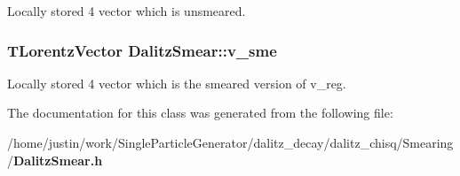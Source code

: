 Locally stored 4 vector which is unsmeared. 

\subsubsection{\setlength{\rightskip}{0pt plus 5cm}TLorentz\-Vector \bf{Dalitz\-Smear::v\_\-sme}}\label{classDalitzSmear_87df42c7420bd96bcd61ce25d10ec6ed}


Locally stored 4 vector which is the smeared version of v\_\-reg. 



The documentation for this class was generated from the following file:\begin{CompactItemize}
\item 
/home/justin/work/Single\-Particle\-Generator/dalitz\_\-decay/dalitz\_\-chisq/Smearing/\bf{Dalitz\-Smear.h}\end{CompactItemize}
